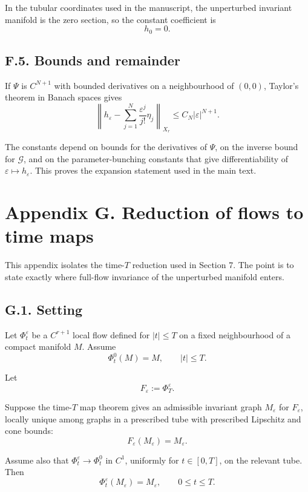 \documentclass[12pt,a4paper]{article}
\theoremstyle{plain}
\numberwithin{equation}{section}
\numberwithin{theorem}{section}
\begin{document}
In the tubular coordinates used in the manuscript, the unperturbed invariant manifold is the zero section, so the constant coefficient is
\[
h_0=0.
\]

\subsection{F.5. Bounds and remainder}

If $\Psi$ is $C^{N+1}$ with bounded derivatives on a neighbourhood of $(0,0)$, Taylor's theorem in Banach spaces gives
\[
\left\|h_\varepsilon-
\sum_{j=1}^{N}
\frac{\varepsilon^j}{j!}
\eta_j
\right\|_{X_r}
\le
C_N|
\varepsilon|^{N+1}.
\]

The constants depend on bounds for the derivatives of $\Psi$, on the inverse bound for $\mathcal G$, and on the parameter-bunching constants that give differentiability of $\varepsilon\mapsto h_\varepsilon$. This proves the expansion statement used in the main text.

\clearpage

\section{Appendix G. Reduction of flows to time maps}

This appendix isolates the time-$T$ reduction used in Section 7. The point is to state exactly where full-flow invariance of the unperturbed manifold enters.

\subsection{G.1. Setting}

Let $\Phi_t^\varepsilon$ be a $C^{r+1}$ local flow defined for $|t|\le T$ on a fixed neighbourhood of a compact manifold $M$. Assume
\[
\Phi_t^0(M)=M,
\qquad |t|\le T.
\]

Let
\[
F_\varepsilon:=\Phi_T^\varepsilon.
\]

Suppose the time-$T$ map theorem gives an admissible invariant graph $M_\varepsilon$ for $F_\varepsilon$, locally unique among graphs in a prescribed tube with prescribed Lipschitz and cone bounds:
\[
F_\varepsilon(M_\varepsilon)=M_\varepsilon.
\]

Assume also that $\Phi_t^\varepsilon\to\Phi_t^0$ in $C^1$, uniformly for $t\in[0,T]$, on the relevant tube. Then
\[
\Phi_t^\varepsilon(M_\varepsilon)=M_\varepsilon,
\qquad 0\le t\le T.
\]
\end{document}
